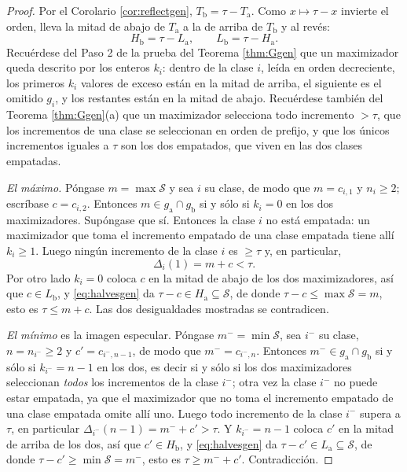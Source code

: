 \documentclass[11pt,reqno]{amsart}
\theoremstyle{plain}
\theoremstyle{definition}
\begin{document}
\begin{proof}
Por el Corolario \ref{cor:reflectgen}, $T_{\mathrm b}=\tau-T_{\mathrm a}$. Como $x\mapsto\tau-x$
invierte el orden, lleva la mitad de abajo de $T_{\mathrm a}$ a la de arriba de $T_{\mathrm b}$ y al
revés:
\begin{equation}\label{eq:halvesgen}
  H_{\mathrm b}=\tau-L_{\mathrm a},\qquad L_{\mathrm b}=\tau-H_{\mathrm a}.
\end{equation}
Recuérdese del Paso 2 de la prueba del Teorema \ref{thm:Ggen} que un maximizador queda descrito por
los enteros $k_i$: dentro de la clase $i$, leída en orden decreciente, los primeros $k_i$ valores de
exceso están en la mitad de arriba, el siguiente es el omitido $g_i$, y los restantes están en la
mitad de abajo. Recuérdese también del Teorema \ref{thm:Ggen}(a) que un maximizador selecciona todo
incremento $>\tau$, que los incrementos de una clase se seleccionan en orden de prefijo, y que los
únicos incrementos iguales a $\tau$ son los dos empatados, que viven en las dos clases empatadas.

\emph{El máximo.} Póngase $m=\max\mathcal{S}$ y sea $i$ su clase, de modo que $m=c_{i,1}$ y
$n_i\ge2$; escríbase $c=c_{i,2}$. Entonces $m\in g_{\mathrm a}\cap g_{\mathrm b}$ si y sólo si
$k_i=0$ en los dos maximizadores. Supóngase que sí. Entonces la clase $i$ no está empatada: un
maximizador que toma el incremento empatado de una clase empatada tiene allí $k_i\ge1$. Luego ningún
incremento de la clase $i$ es $\ge\tau$ y, en particular,
\[
  \Delta_i(1)=m+c<\tau .
\]
Por otro lado $k_i=0$ coloca $c$ en la mitad de abajo de los dos maximizadores, así que
$c\in L_{\mathrm b}$, y \eqref{eq:halvesgen} da $\tau-c\in H_{\mathrm a}\subseteq\mathcal{S}$, de
donde $\tau-c\le\max\mathcal{S}=m$, esto es $\tau\le m+c$. Las dos desigualdades mostradas se
contradicen.

\emph{El mínimo} es la imagen especular. Póngase $m^{-}=\min\mathcal{S}$, sea $i^{-}$ su clase,
$n=n_{i^{-}}\ge2$ y $c'=c_{i^{-},n-1}$, de modo que $m^{-}=c_{i^{-},n}$. Entonces
$m^{-}\in g_{\mathrm a}\cap g_{\mathrm b}$ si y sólo si $k_{i^{-}}=n-1$ en los dos, es decir si y
sólo si los dos maximizadores seleccionan \emph{todos} los incrementos de la clase $i^{-}$; otra vez
la clase $i^{-}$ no puede estar empatada, ya que el maximizador que no toma el incremento empatado de
una clase empatada omite allí uno. Luego todo incremento de la clase $i^{-}$ supera a $\tau$, en
particular $\Delta_{i^{-}}(n-1)=m^{-}+c'>\tau$. Y $k_{i^{-}}=n-1$ coloca $c'$ en la mitad de arriba
de los dos, así que $c'\in H_{\mathrm b}$, y \eqref{eq:halvesgen} da
$\tau-c'\in L_{\mathrm a}\subseteq\mathcal{S}$, de donde $\tau-c'\ge\min\mathcal{S}=m^{-}$, esto es
$\tau\ge m^{-}+c'$. Contradicción.
\end{proof}
\end{document}
